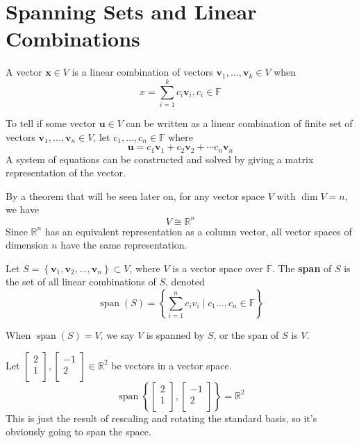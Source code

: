 \section{Spanning Sets and Linear Combinations}
\begin{definition}
    A vector \(\mathbf{x} \in V\) is a linear combination of vectors \(\mathbf{v} _1,\ldots,\mathbf{v} _k\in V\) when 
    \[
        x=\sum_{i=1}^{k}c_i \mathbf{v} _i ,c_i\in\mathbb{F}  
    \]
\end{definition}
To tell if some vector \(\mathbf{u} \in V\) can be written as a linear combination of  finite set of vectors \(\mathbf{v} _1,\ldots,\mathbf{v} _n \in V\), let \(c_1,\ldots,c_n \in\mathbb{F} \) where 
\[
    \mathbf{u} =c_1 \mathbf{v} _1 + c_2 \mathbf{v} _2 + \cdots c_n \mathbf{v} _n
\]
A system of equations can be constructed and solved by giving a matrix representation of the vector.
\begin{remark}
    By a theorem that will be seen later on, for any vector space \(V\) with \(\dim V =n\), we have 
    \[
        V\cong \mathbb{R} ^n
    \]
    Since \(\mathbb{R} ^n\) has an equivalent representation as a column vector, all vector spaces of dimension \(n\) have the same representation.
\end{remark}
\begin{definition}[Span]
    Let \(S=\left\{ \mathbf{v} _1 ,\mathbf{v} _2,\ldots,\mathbf{v} _n \right\} \subset V \), where \(V\) is a vector space over \(\mathbb{F} \). The \textbf{span} of \(S\) is the set of all linear combinations of \(S\), denoted 
    \[
        \operatorname{span}(S) =\left\{ \sum_{i=1}^n c_i v_i \mid c_1\ldots,c_n \in \mathbb{F}  \right\} 
    \]
\end{definition}
\begin{remark}
    When \(\operatorname{span}(S)=V \), we say \(V\) is spanned by \(S\), or the span of \(S\) is \(V\).
\end{remark}
\begin{eg}
    Let \(\begin{bmatrix}
         2 \\
         1 \\
    \end{bmatrix}, \begin{bmatrix}
         -1 \\
          2\\
    \end{bmatrix}\in\mathbb{R}^2\) be vectors in a vector space.
    \[
        \operatorname{span}\left\{ \begin{bmatrix}
             2 \\
             1 \\
        \end{bmatrix},\begin{bmatrix}
             -1 \\
              2\\
        \end{bmatrix} \right\}  =\mathbb{R} ^2
    \]
    This is just  the result of rescaling and rotating the standard basis, so it's obviously going to span the space.
\end{eg}
